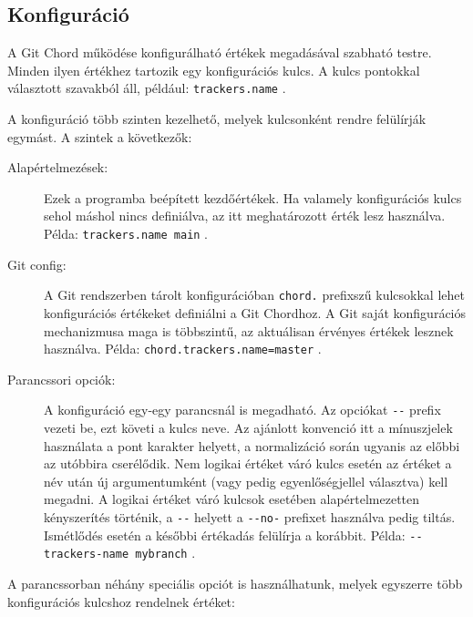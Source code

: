 \documentclass[final]{elteikthesis}[2025/03/25]
\begin{document}
\subsection{Konfiguráció}

A Git Chord működése konfigurálható értékek megadásával szabható testre.
Minden ilyen értékhez tartozik egy konfigurációs kulcs.
A kulcs pontokkal választott szavakból áll, például: \verb|trackers.name| .

A konfiguráció több szinten kezelhető, melyek kulcsonként rendre felülírják egymást.
A szintek a következők:

\begin{description}
    \item[Alapértelmezések:]
        Ezek a programba beépített kezdőértékek.
        Ha valamely konfigurációs kulcs sehol máshol nincs definiálva, az itt meghatározott érték lesz használva.
        Példa: \verb|trackers.name main| .
    \item[Git config:]
        A Git rendszerben tárolt konfigurációban \verb|chord.| prefixszű kulcsokkal lehet konfigurációs értékeket definiálni a Git Chordhoz.
        A Git saját konfigurációs mechanizmusa maga is többszintű,
        az aktuálisan érvényes értékek lesznek használva.
        Példa: \verb|chord.trackers.name=master| .
    \item[Parancssori opciók:]
        A konfiguráció egy-egy parancsnál is megadható.
        Az opciókat \verb|--| prefix vezeti be, ezt követi a kulcs neve.
        Az ajánlott konvenció itt a mínuszjelek használata a pont karakter helyett,
        a normalizáció során ugyanis az előbbi az utóbbira cserélődik.
        Nem logikai értéket váró kulcs esetén az értéket a név után új argumentumként (vagy pedig egyenlőségjellel választva) kell megadni.
        A logikai értéket váró kulcsok esetében alapértelmezetten kényszerítés történik,
        a \verb|--| helyett a \verb|--no-| prefixet használva pedig tiltás.
        Ismétlődés esetén a későbbi értékadás felülírja a korábbit.
        Példa: \verb|--trackers-name mybranch| .
\end{description}

A parancssorban néhány speciális opciót is használhatunk, melyek egyszerre több konfigurációs kulcshoz rendelnek értéket:
\end{document}
